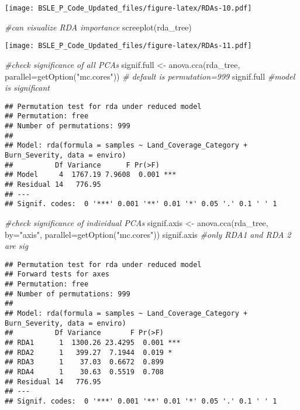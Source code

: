 \documentclass[
]{article}
\newenvironment{Shaded}{\begin{snugshade}}{\end{snugshade}}
\newcommand{\AttributeTok}[1]{\textcolor[rgb]{0.77,0.63,0.00}{#1}}
\newcommand{\CommentTok}[1]{\textcolor[rgb]{0.56,0.35,0.01}{\textit{#1}}}
\newcommand{\FunctionTok}[1]{\textcolor[rgb]{0.00,0.00,0.00}{#1}}
\newcommand{\NormalTok}[1]{#1}
\newcommand{\OtherTok}[1]{\textcolor[rgb]{0.56,0.35,0.01}{#1}}
\newcommand{\StringTok}[1]{\textcolor[rgb]{0.31,0.60,0.02}{#1}}
\begin{document}
\texttt{[image: BSLE\_P\_Code\_Updated\_files/figure-latex/RDAs-10.pdf]}

\begin{Shaded}
\begin{Highlighting}[]
\CommentTok{\#can visualize RDA importance}
\FunctionTok{screeplot}\NormalTok{(rda\_tree)}
\end{Highlighting}
\end{Shaded}

\texttt{[image: BSLE\_P\_Code\_Updated\_files/figure-latex/RDAs-11.pdf]}

\begin{Shaded}
\begin{Highlighting}[]
\CommentTok{\#check significance of all PCAs}
\NormalTok{signif.full }\OtherTok{\textless{}{-}} \FunctionTok{anova.cca}\NormalTok{(rda\_tree, }\AttributeTok{parallel=}\FunctionTok{getOption}\NormalTok{(}\StringTok{"mc.cores"}\NormalTok{)) }\CommentTok{\# default is permutation=999}
\NormalTok{signif.full }\CommentTok{\#model is significant}
\end{Highlighting}
\end{Shaded}

\begin{verbatim}
## Permutation test for rda under reduced model
## Permutation: free
## Number of permutations: 999
## 
## Model: rda(formula = samples ~ Land_Coverage_Category + Burn_Severity, data = enviro)
##          Df Variance      F Pr(>F)    
## Model     4  1767.19 7.9608  0.001 ***
## Residual 14   776.95                  
## ---
## Signif. codes:  0 '***' 0.001 '**' 0.01 '*' 0.05 '.' 0.1 ' ' 1
\end{verbatim}

\begin{Shaded}
\begin{Highlighting}[]
\CommentTok{\#check significance of individual PCAs}
\NormalTok{signif.axis }\OtherTok{\textless{}{-}} \FunctionTok{anova.cca}\NormalTok{(rda\_tree, }\AttributeTok{by=}\StringTok{"axis"}\NormalTok{, }\AttributeTok{parallel=}\FunctionTok{getOption}\NormalTok{(}\StringTok{"mc.cores"}\NormalTok{))}
\NormalTok{signif.axis }\CommentTok{\#only RDA1 and RDA 2 are sig}
\end{Highlighting}
\end{Shaded}

\begin{verbatim}
## Permutation test for rda under reduced model
## Forward tests for axes
## Permutation: free
## Number of permutations: 999
## 
## Model: rda(formula = samples ~ Land_Coverage_Category + Burn_Severity, data = enviro)
##          Df Variance       F Pr(>F)    
## RDA1      1  1300.26 23.4295  0.001 ***
## RDA2      1   399.27  7.1944  0.019 *  
## RDA3      1    37.03  0.6672  0.899    
## RDA4      1    30.63  0.5519  0.708    
## Residual 14   776.95                   
## ---
## Signif. codes:  0 '***' 0.001 '**' 0.01 '*' 0.05 '.' 0.1 ' ' 1
\end{verbatim}
\end{document}
